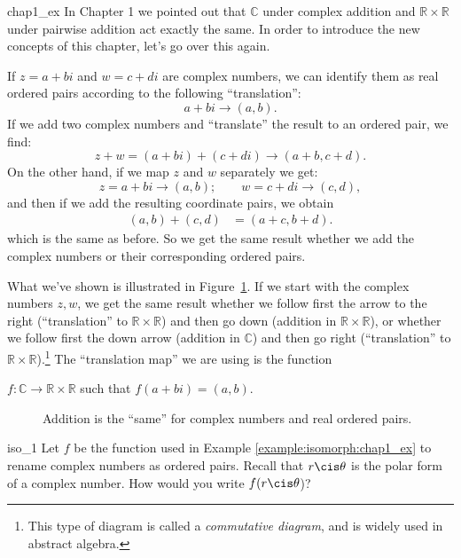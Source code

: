 \begin{example}{chap1_ex}
In Chapter 1 we pointed out that ${\mathbb C}$ under complex addition and ${\mathbb R} \times {\mathbb R}$ under pairwise addition act exactly the same. In order to introduce the new concepts of this chapter, let's go over this again. 

If $z = a+bi$ and $w = c+di$ are complex numbers, we can identify  them as real ordered pairs according to the following ``translation'':
\[ a+bi \longrightarrow (a,b). \]
If we add two complex numbers and ``translate'' the result to an ordered pair, we find:
\[
z + w = (a + bi) + (c + di)  \longrightarrow (a+b,c+d).
\]
On the other hand, if we map $z$ and $w$ separately we get:
\[
z = a + bi  \longrightarrow (a,b);\qquad w = c+di  \longrightarrow (c,d),
\]
and then if we add the resulting  coordinate pairs, we obtain
\begin{align*}
(a,b) +  (c,d) 
&= (a+c,b+d). 
\end{align*}
which is the same as before. So we get the same result whether we add the complex numbers or their corresponding ordered pairs.  

What we've shown  is illustrated in Figure~\ref{fig:groups:CommDiag}. If we start with the complex numbers $z,w$, we get the same result whether we follow first the arrow to the right (``translation'' to ${\mathbb R} \times {\mathbb R}$) and then go down (addition in ${\mathbb R} \times {\mathbb R}$), or whether we follow first the down arrow (addition in ${\mathbb C}$) and then go right (``translation'' to ${\mathbb R} \times {\mathbb R}$).\footnote{This type of diagram is called a \emph{commutative diagram}, and is widely used in abstract algebra.} The ``translation map'' we are using is the function 
\begin{center}
$f : {\mathbb C} \longrightarrow {\mathbb R} \times {\mathbb R}$ such that $f(a + bi) = (a,b)$.
\end{center}

\begin{figure}[htb]
	  \caption{\label{fig:groups:CommDiag} Addition is the ``same'' for complex numbers and real ordered pairs. }
\end{figure}

\end{example}

\begin{exercise}{iso_1}
Let $f$ be  the function used in Example \ref{example:isomorph:chap1_ex} to rename complex numbers as ordered pairs. Recall that $r \cis \theta$ is the polar form of a complex number. How would you write $f(r \cis \theta$)?
\end{exercise}

